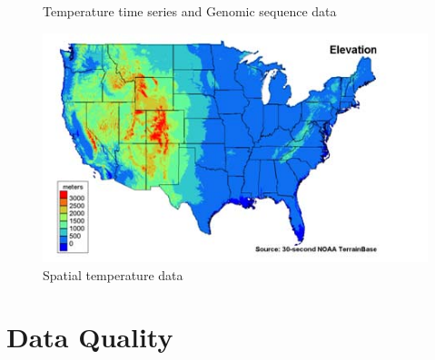 		\begin{figure}[H]
			\centering
			\caption{Temperature time series and Genomic sequence data}
		\end{figure}

		\begin{figure}[H]
			\centering
			\includegraphics[scale=0.5]{pics/spatialTemp.jpg}
			\caption{Spatial temperature data}
		\end{figure}


\section{Data Quality}
	
